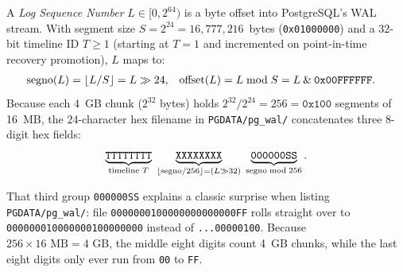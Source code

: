 \begin{definition}
\label{ch04:def-lsn}
A \emph{Log Sequence Number} $L \in [0, 2^{64})$ is a byte offset into PostgreSQL's WAL stream. With segment size $S = 2^{24} = 16{,}777{,}216$~bytes (\texttt{0x01000000}) and a 32-bit timeline ID $T \ge 1$ (starting at $T = 1$ and incremented on point-in-time recovery promotion), $L$ maps to:
\begin{align*}
  \mathrm{segno}(L) &= \lfloor L / S\rfloor = L \gg 24, &
  \mathrm{offset}(L) &= L \bmod S = L \mathbin{\&} \texttt{0x00FFFFFF}.
\end{align*}
Because each 4~GB chunk ($2^{32}$ bytes) holds $2^{32} / 2^{24} = 256 = \texttt{0x100}$ segments of 16~MB, the 24-character hex filename in \texttt{PGDATA/pg\_wal/} concatenates three 8-digit hex fields:
\[
  \underbrace{\texttt{TTTTTTTT}}_{\text{timeline } T}
  \;\underbrace{\texttt{XXXXXXXX}}_{\lfloor\mathrm{segno}/256\rfloor = (L \gg 32)}
  \;\underbrace{\texttt{000000SS}}_{\mathrm{segno} \bmod 256}.
\]
\end{definition}

That third group \texttt{000000SS} explains a classic surprise when listing \texttt{PGDATA/pg\_wal/}: file \texttt{0000000100000000000000FF} rolls straight over to \texttt{000000010000000100000000} instead of \texttt{...00000100}. Because $256 \times 16\text{ MB} = 4\text{ GB}$, the middle eight digits count 4~GB chunks, while the last eight digits only ever run from \texttt{00} to \texttt{FF}.

